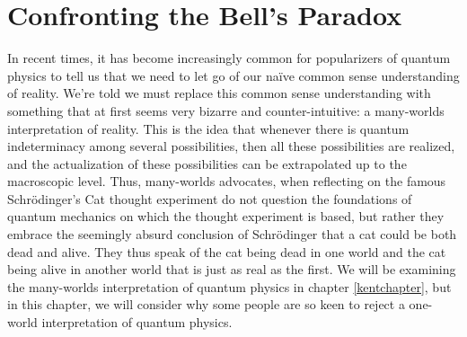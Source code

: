 \begin{comment}
    \section{Introduction}
    \emph{}
    
    Common sense is very often underrated. This is especially so in the light of modern physics. Not infrequently, one hears people claim that modern physics shows us that reality is fundamentally weird and that we must discard our naïve common sense intuitions. Now perhaps these people are right, but if we are to accept their claims, they ought to have really compelling reasons. The usual response to an argument that results in weird or seemingly absurd conclusions is to question the argument's premises or examine whether the argument is logically valid. 
\end{comment}
    \chapter{Confronting the Bell's Paradox}
    In recent times, it has become increasingly common for popularizers of quantum physics to tell us that we need to let go of our naïve common sense understanding of reality. We're told we must replace this common sense understanding with something that at first seems very bizarre and counter-intuitive: a many-worlds interpretation of reality. This is the idea that whenever there is quantum indeterminacy among several possibilities, then all these possibilities are realized, and the actualization of these possibilities can be extrapolated up to the macroscopic level. Thus, many-worlds advocates, when reflecting on the famous Schr\"{o}dinger's Cat thought experiment do not question the foundations of quantum mechanics on which the thought experiment is based, but rather they embrace the seemingly absurd conclusion of Schr\"{o}dinger that a cat could be both dead and alive. They thus speak of the cat being dead in one world and the cat being alive in another world that is just as real as the first. We will be examining the many-worlds interpretation of quantum physics in chapter \ref{kentchapter}, but in this chapter, we will consider why some people are so keen to reject a one-world interpretation of quantum physics.
    
